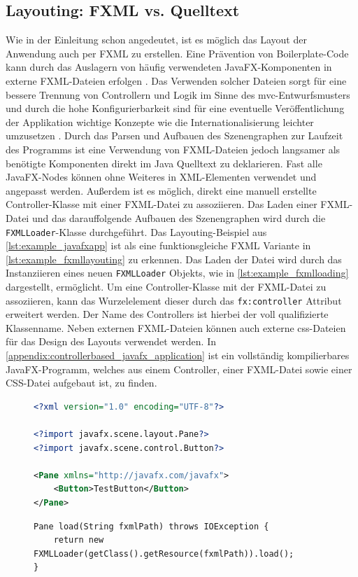 \subsection{Layouting: FXML vs. Quelltext}
Wie in der Einleitung schon angedeutet, ist es möglich das Layout der Anwendung auch per FXML zu erstellen. Eine Prävention von Boilerplate-Code kann durch das Auslagern von häufig verwendeten JavaFX-Komponenten in externe FXML-Dateien erfolgen \cite{Kruk2018}. Das Verwenden solcher Dateien sorgt für eine bessere Trennung von Controllern und Logik im Sinne des \ac{mvc}-Entwurfsmusters \cite{Juneau2013} und durch die hohe Konfigurierbarkeit sind für eine eventuelle Veröffentlichung der Applikation wichtige Konzepte wie die Internationalisierung leichter umzusetzen \cite{Steyer2014}. Durch das Parsen und Aufbauen des Szenengraphen zur Laufzeit des Programms ist eine Verwendung von FXML-Dateien jedoch langsamer als benötigte Komponenten direkt im Java Quelltext zu deklarieren. Fast alle JavaFX-Nodes können ohne Weiteres in XML-Elementen verwendet und angepasst werden. Außerdem ist es möglich, direkt eine manuell erstellte Controller-Klasse mit einer FXML-Datei zu assoziieren. Das Laden einer FXML-Datei und das darauffolgende Aufbauen des Szenengraphen wird durch die \texttt{FXMLLoader}-Klasse durchgeführt. Das Layouting-Beispiel aus \autoref{lst:example_javafxapp} ist als eine funktionsgleiche FXML Variante in \autoref{lst:example_fxmllayouting} zu erkennen. Das Laden der Datei wird durch das Instanziieren eines neuen \texttt{FXMLLoader} Objekts, wie in \autoref{lst:example_fxmlloading} dargestellt, ermöglicht.
\noindent Um eine Controller-Klasse mit der FXML-Datei zu assoziieren, kann das Wurzelelement dieser durch das \texttt{fx:controller} Attribut erweitert werden. Der Name des Controllers ist hierbei der voll qualifizierte Klassenname. Neben externen FXML-Dateien können auch externe \ac{css}-Dateien für das Design des Layouts verwendet werden. In \autoref{appendix:controllerbased_javafx_application} ist ein vollständig kompilierbares JavaFX-Programm, welches aus einem Controller, einer FXML-Datei sowie einer CSS-Datei aufgebaut ist, zu finden.

\begin{figure}[H]
	\begin{lstlisting}[caption={Beispiel -- FXML Layouting}, captionpos=b, label=lst:example_fxmllayouting, language=XML]
<?xml version="1.0" encoding="UTF-8"?>

<?import javafx.scene.layout.Pane?>
<?import javafx.scene.control.Button?>

<Pane xmlns="http://javafx.com/javafx">
	<Button>TestButton</Button>
</Pane>
	\end{lstlisting}
\end{figure}
\begin{figure}[H]
	\begin{lstlisting}[caption={Beispiel -- FXML Ladeprozess}, captionpos=b, label=lst:example_fxmlloading]
Pane load(String fxmlPath) throws IOException {
	return new FXMLLoader(getClass().getResource(fxmlPath)).load();
}
	\end{lstlisting}
\end{figure}

